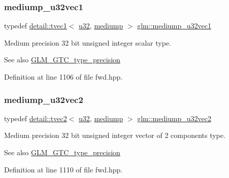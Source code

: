 \subsubsection{\texorpdfstring{mediump\+\_\+u32vec1}{mediump\_u32vec1}}
{\footnotesize\ttfamily typedef \hyperlink{structglm_1_1detail_1_1tvec1}{detail\+::tvec1}$<$ \hyperlink{group__gtc__type__precision_ga54e837745059fd29017bed71cfa0a8db}{u32}, \hyperlink{namespaceglm_a0f04f086094c747d227af4425893f545a6416f3ea0c9025fb21ed50c4d6620482}{mediump} $>$ \hyperlink{group__gtc__type__precision_ga323fb0ed8f492d918b087226db2994f3}{glm\+::mediump\+\_\+u32vec1}}

Medium precision 32 bit unsigned integer scalar type. \begin{DoxySeeAlso}{See also}
\hyperlink{group__gtc__type__precision}{G\+L\+M\+\_\+\+G\+T\+C\+\_\+type\+\_\+precision} 
\end{DoxySeeAlso}


Definition at line 1106 of file fwd.\+hpp.

\mbox{\label{group__gtc__type__precision_ga5d16ea7e110d8ba923ca347c16704f88}} 
\subsubsection{\texorpdfstring{mediump\+\_\+u32vec2}{mediump\_u32vec2}}
{\footnotesize\ttfamily typedef \hyperlink{structglm_1_1detail_1_1tvec2}{detail\+::tvec2}$<$ \hyperlink{group__gtc__type__precision_ga54e837745059fd29017bed71cfa0a8db}{u32}, \hyperlink{namespaceglm_a0f04f086094c747d227af4425893f545a6416f3ea0c9025fb21ed50c4d6620482}{mediump} $>$ \hyperlink{group__gtc__type__precision_ga5d16ea7e110d8ba923ca347c16704f88}{glm\+::mediump\+\_\+u32vec2}}

Medium precision 32 bit unsigned integer vector of 2 components type. \begin{DoxySeeAlso}{See also}
\hyperlink{group__gtc__type__precision}{G\+L\+M\+\_\+\+G\+T\+C\+\_\+type\+\_\+precision} 
\end{DoxySeeAlso}


Definition at line 1110 of file fwd.\+hpp.

\mbox{\label{group__gtc__type__precision_ga84a903ce8834b22f78d80a64eb0181bb}} 
